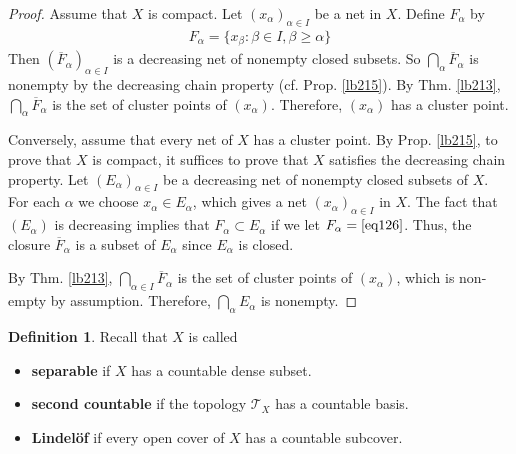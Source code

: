\documentclass[12pt,b5paper,notitlepage]{article}
\theoremstyle{definition}
\newtheorem{df}{Definition}[subsection]
\theoremstyle{plain}
\newcommand{\ovl}{\overline}
\newcommand{\MT}{\mathcal T}
\numberwithin{equation}{section}
\begin{document}
\begin{proof}
Assume that $X$ is compact. Let $(x_\alpha)_{\alpha\in I}$ be a net in $X$. Define $F_\alpha$ by 
\begin{align}
F_\alpha=\{x_\beta:\beta\in I,\beta\geq\alpha \}\label{eq126}
\end{align}
Then $(\ovl F_\alpha)_{\alpha\in I}$ is a decreasing net of nonempty closed subsets. So $\bigcap_\alpha\ovl F_\alpha$ is nonempty by the decreasing chain property (cf. Prop. \ref{lb215}). By Thm. \ref{lb213}, $\bigcap_\alpha\ovl F_\alpha$ is the set of cluster points of $(x_\alpha)$. Therefore, $(x_\alpha)$ has a cluster point.


Conversely, assume that every net of $X$ has a cluster point. By Prop. \ref{lb215}, to prove that $X$ is compact, it suffices to prove that $X$ satisfies the decreasing chain property. Let $(E_\alpha)_{\alpha\in I}$ be a decreasing net of nonempty closed subsets of $X$. For each $\alpha$ we choose $x_\alpha\in E_\alpha$, which gives a net $(x_\alpha)_{\alpha\in I}$ in $X$. The fact that $(E_\alpha)$ is decreasing implies that $F_\alpha\subset E_\alpha$ if we let $F_\alpha=\eqref{eq126}$. Thus, the closure $\ovl F_\alpha$ is a subset of $E_\alpha$ since $E_\alpha$ is closed. 

By Thm. \ref{lb213},  $\bigcap_{\alpha\in I}\ovl F_\alpha$ is the set of cluster points of $(x_\alpha)$, which is non-empty by assumption. Therefore, $\bigcap_\alpha E_\alpha$ is nonempty.
\end{proof}


\begin{df}
Recall that $X$ is called
\begin{itemize}
\item \textbf{separable}  if $X$ has a countable dense subset.
\item \textbf{second countable}  if the topology $\MT_X$ has a countable basis.
\item \textbf{Lindel\"of}  if every open cover of $X$ has a countable subcover. 
\end{itemize}
\end{df}
\end{document}
